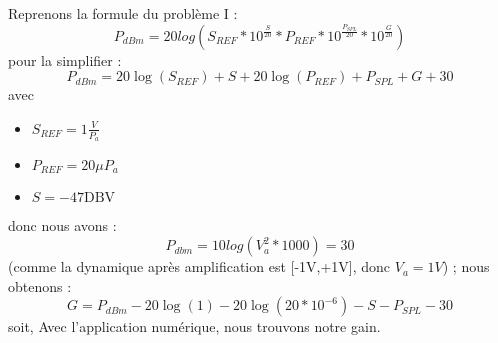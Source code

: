 Reprenons la formule du problème I :
\begin{equation}
    P_{dBm} = 20log(S_{REF}*10^\frac{S}{20}*P_{REF}*10^\frac{P_{SPL}}{20}*10^\frac{G}{20})
\end{equation}
pour la simplifier : 
\begin{equation}
    P_{dBm} = 20\log(S_{REF}) + S + 20\log(P_{REF}) + P_{SPL} + G + 30
\end{equation}
avec 
\begin{itemize}
    \item $S_{REF} = 1\frac{V}{P_a}$
    \item $P_{REF} = 20\mu P_a$
    \item $S = -47 \text{DBV}$
\end{itemize}
donc nous avons :
\begin{equation}
    P_{dbm} = 10log(V_a^2 * 1000) = 30
\end{equation}
(comme la dynamique après amplification est [-1V,+1V], donc $V_a = 1V$)
; nous obtenons :
\begin{equation}
    G = P_{dBm} - 20\log(1) - 20\log(20*10^{-6}) - S - P_{SPL} - 30 
\end{equation}
soit,
Avec l'application numérique, nous trouvons notre gain.
